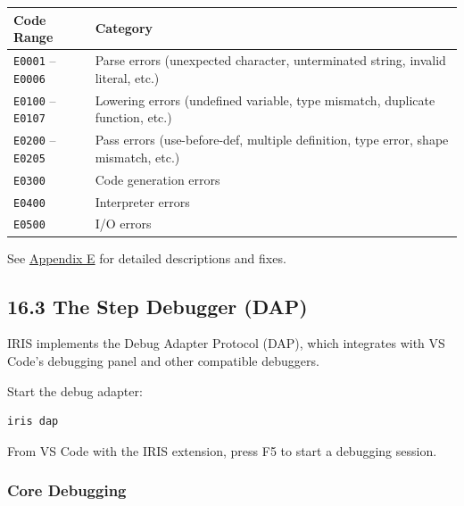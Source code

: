 \documentclass[
  english,
]{book}
\begin{document}
\begin{longtable}[]{@{}
  >{\raggedright\arraybackslash}p{}
  >{\raggedright\arraybackslash}p{}@{}}
\toprule\noalign{}
\begin{minipage}[b]{\linewidth}\raggedright
Code Range
\end{minipage} & \begin{minipage}[b]{\linewidth}\raggedright
Category
\end{minipage} \\
\midrule\noalign{}
\endhead
\bottomrule\noalign{}
\endlastfoot
\texttt{E0001} -- \texttt{E0006} & Parse errors (unexpected character,
unterminated string, invalid literal, etc.) \\
\texttt{E0100} -- \texttt{E0107} & Lowering errors (undefined variable,
type mismatch, duplicate function, etc.) \\
\texttt{E0200} -- \texttt{E0205} & Pass errors (use-before-def, multiple
definition, type error, shape mismatch, etc.) \\
\texttt{E0300} & Code generation errors \\
\texttt{E0400} & Interpreter errors \\
\texttt{E0500} & I/O errors \\
\end{longtable}

See \hyperref[appendix-e-compiler-error-reference]{Appendix E} for
detailed descriptions and fixes.

\subsection{16.3 The Step Debugger (DAP)}\label{the-step-debugger-dap}

IRIS implements the Debug Adapter Protocol (DAP), which integrates with
VS Code's debugging panel and other compatible debuggers.

Start the debug adapter:

\begin{verbatim}
iris dap
\end{verbatim}

From VS Code with the IRIS extension, press F5 to start a debugging
session.

\subsubsection{Core Debugging}\label{core-debugging}
\end{document}
